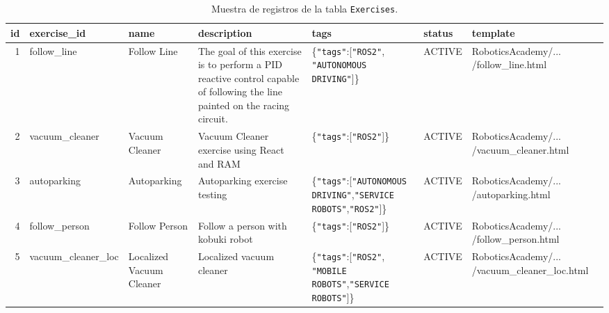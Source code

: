 \documentclass[a4paper, 12pt]{book}
\begin{document}
\begin{table}[!htb]
\centering
\caption{Muestra de registros de la tabla \texttt{Exercises}.}
\label{tbl:exercises_sample}
{\scriptsize
\hspace*{-1.5cm}\begin{tabular}{r l p{2cm} p{4cm} p{2.75cm} p{1.5cm} p{2.75cm}}
\toprule
\textbf{id} & \textbf{exercise\_id}       & \textbf{name}              & \textbf{description}                                                                                                 & \textbf{tags}                                                         & \textbf{status} & \textbf{template}                                                               \\
\midrule
1  & follow\_line           & Follow Line            & The goal of this exercise is to perform a PID reactive control capable of following the line painted on the racing circuit. & \{\texttt{"tags"}:[\texttt{"ROS2"},  \texttt{"AUTONOMOUS DRIVING"}]\}    & ACTIVE         & RoboticsAcademy/... /follow\_line.html           \\
2  & vacuum\_cleaner        & Vacuum Cleaner         & Vacuum Cleaner exercise using React and RAM                                                                                    & \{\texttt{"tags"}:[\texttt{"ROS2"}]\}                                  & ACTIVE         & RoboticsAcademy/... /vacuum\_cleaner.html        \\
3  & autoparking            & Autoparking            & Autoparking exercise testing                                                                                                    & \{\texttt{"tags"}:[\texttt{"AUTONOMOUS DRIVING"},\texttt{"SERVICE ROBOTS"},\texttt{"ROS2"}]\} & ACTIVE         & RoboticsAcademy/... /autoparking.html           \\
4  & follow\_person         & Follow Person          & Follow a person with kobuki robot                                                                                               & \{\texttt{"tags"}:[\texttt{"ROS2"}]\}                                  & ACTIVE         & RoboticsAcademy/... /follow\_person.html        \\
5  & vacuum\_cleaner\_loc   & Localized Vacuum Cleaner & Localized vacuum cleaner                                                                                                        & \{\texttt{"tags"}:[\texttt{"ROS2"}, \texttt{"MOBILE ROBOTS"},\texttt{"SERVICE ROBOTS"}]\}     & ACTIVE         & RoboticsAcademy/... /vacuum\_cleaner\_loc.html \\

\end{tabular}}
\end{table}
\end{document}

